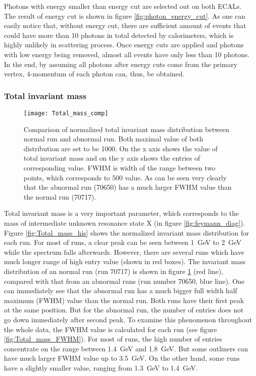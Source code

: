 Photons with energy smaller than energy cut are selected out on both ECALs. The result of energy cut is shown in figure \ref{fig:photon_energy_cut}. As one can easily notice that, without energy cut, there are sufficient amount of events that could have more than 10 photons in total detected by calorimeters, which is highly unlikely in scattering process. Once energy cuts are applied and photons with low energy being removed, almost all events have only less than 10 photons. In the end, by assuming all photons after energy cuts come from the primary vertex, 4-momentum of each photon can, thus, be obtained.
\subsubsection{Total invariant mass}
\begin{figure}[!t]
	\centering
	\texttt{[image: Total\_mass\_comp]}
	\caption{Comparison of normalized total invariant mass distribution between normal run and abnormal run. Both maximal value of both distribution are set to be 1000. On the x axis shows the value of total invariant mass and on the y axis shows the entries of corresponding value. FWHM is width of the range between two points, which corresponds to 500 value. As can be seen very clearly that the abnormal run (70650) has a much larger FWHM value than the normal run (70717).}
	\label{fig:Total_mass_comp}
\end{figure}
Total invariant mass is a very important parameter, which corresponds to the mass of intermediate unknown resonance state X (in figure \ref{fig:feymann_diag}). Figure \ref{fig:Total_mass_his} shows the normalized invariant mass distribution for each run. For most of runs, a clear peak can be seen between \SI{1}{\giga\electronvolt} to \SI{2}{\giga\electronvolt} while the spectrum falls afterwards. However, there are several runs which have much longer range of high entry value (shown in red boxes). The invariant mass distribution of an normal run (run 70717) is shown in figure \ref{fig:Total_mass_comp} (red line), compared with that from an abnormal runs (run number 70650, blue line). One can immediately see that the abnormal run has a much bigger full width half maximum (FWHM) value than the normal run. Both runs have their first peak at the same position. But for the abnormal run, the number of entries does not go down immediately after second peak. To examine this phenomenon throughout the whole data, the FWHM value is calculated for each run (see figure \ref{fig:Total_mass_FWHM}). For most of runs, the high number of entries concentrate on the range between \SI{1.4}{\giga\electronvolt} and \SI{1.8}{\giga\electronvolt}. But some outliners can have much larger FWHM value up to \SI{3.5}{\giga\electronvolt}. On the other hand, some runs have a slightly smaller value, ranging from \SI{1.3}{\giga\electronvolt} to \SI{1.4}{\giga\electronvolt}.

